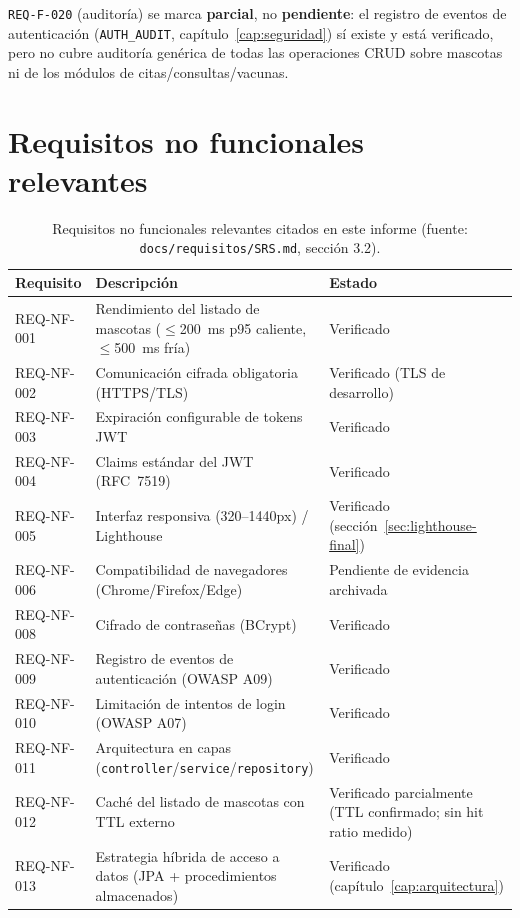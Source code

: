 \texttt{REQ-F-020} (auditor\'ia) se marca \textbf{parcial}, no
\textbf{pendiente}: el registro de eventos de autenticaci\'on
(\texttt{AUTH\_AUDIT}, cap\'itulo~\ref{cap:seguridad}) s\'i existe y est\'a
verificado, pero no cubre auditor\'ia gen\'erica de todas las operaciones
CRUD sobre mascotas ni de los m\'odulos de citas/consultas/vacunas.

\section{Requisitos no funcionales relevantes}

\begin{table}[H]
  \centering
  \small
  \caption{Requisitos no funcionales relevantes citados en este informe (fuente: \texttt{docs/requisitos/SRS.md}, secci\'on 3.2).}
  \label{tab:req-nf-relevantes}
  \begin{tabular}{@{}p{2.0cm}p{6.6cm}p{2.6cm}@{}}
    \toprule
    Requisito & Descripci\'on & Estado \\
    \midrule
    REQ-NF-001 & Rendimiento del listado de mascotas ($\leq$200~ms p95 caliente, $\leq$500~ms fr\'ia) & Verificado \\
    REQ-NF-002 & Comunicaci\'on cifrada obligatoria (HTTPS/TLS) & Verificado (TLS de desarrollo) \\
    REQ-NF-003 & Expiraci\'on configurable de tokens JWT & Verificado \\
    REQ-NF-004 & Claims est\'andar del JWT (RFC~7519) & Verificado \\
    REQ-NF-005 & Interfaz responsiva (320--1440px) / Lighthouse & Verificado (secci\'on~\ref{sec:lighthouse-final}) \\
    REQ-NF-006 & Compatibilidad de navegadores (Chrome/Firefox/Edge) & Pendiente de evidencia archivada \\
    REQ-NF-008 & Cifrado de contrase\~nas (BCrypt) & Verificado \\
    REQ-NF-009 & Registro de eventos de autenticaci\'on (OWASP A09) & Verificado \\
    REQ-NF-010 & Limitaci\'on de intentos de login (OWASP A07) & Verificado \\
    REQ-NF-011 & Arquitectura en capas (\texttt{controller}/\texttt{service}/\texttt{repository}) & Verificado \\
    REQ-NF-012 & Cach\'e del listado de mascotas con TTL externo & Verificado parcialmente (TTL confirmado; sin hit ratio medido) \\
    REQ-NF-013 & Estrategia h\'ibrida de acceso a datos (JPA + procedimientos almacenados) & Verificado (cap\'itulo~\ref{cap:arquitectura}) \\
    \bottomrule
  \end{tabular}
\end{table}

